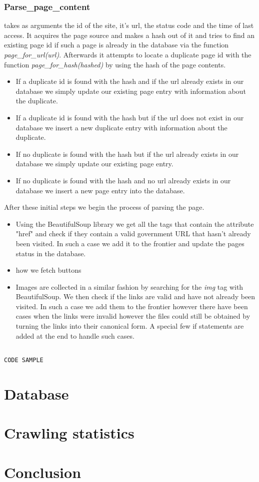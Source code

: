 \documentclass[runningheads]{llncs}
\begin{document}
\subsubsection{Parse\_page\_content}
takes as arguments the id of the site, it's url, the status code and the time of last access. It acquires the page source and makes a hash out of it and tries to find an existing page id if such a page is already in the database via the function \textit{page\_for\_url(url)}. Afterwards it attempts to locate a duplicate page id with the function \textit{page\_for\_hash(hashed)} by using the hash of the page contents. 
\begin{itemize}
  \item If a duplicate id is found with the hash and if the url already exists in our database we simply update our existing page entry with information about the duplicate.
  \item If a duplicate id is found with the hash but if the url does not exist in our database we insert a new duplicate entry with information about the duplicate.
  \item If no duplicate is found with the hash but if the url already exists in our database we simply update our existing page entry.
  \item If no duplicate is found with the hash and no url already exists in our database we insert a new page entry into the database.
\end{itemize}
After these initial steps we begin the process of parsing the page.
\begin{itemize}
\item Using the BeautifulSoup library we get all the tags that contain the attribute "href" and check if they contain a valid government URL that hasn't already been visited. In such a case we add it to the frontier and update the pages status in the database.
\item how we fetch buttons
\item Images are collected in a similar fashion by searching for the \textit{img} tag with BeautifulSoup. We then check if the links are valid and have not already been visited. In such a case we add them to the frontier however there have been cases when the links were invalid however the files could still be obtained by turning the links into their canonical form. A special few if statements are added at the end to handle such cases.
\end{itemize}

\begin{lstlisting}

CODE SAMPLE

\end{lstlisting}



\section{Database}

\section{Crawling statistics}

\section{Conclusion}

 
 
 
\end{document}
